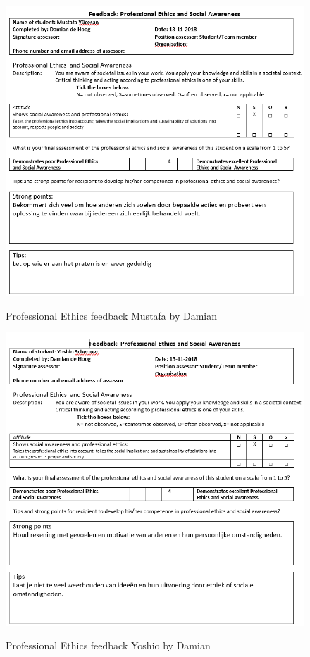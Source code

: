 \documentclass[12pt]{article}
\begin{document}
	\begin{figure}[p!]
		\centering
		\includegraphics[width=\columnwidth]{ProfEthMustafa.PNG}\\
		\caption{Professional Ethics feedback Mustafa by Damian}
	\end{figure}
	\begin{figure}[p!]
		\centering
		\includegraphics[width=\columnwidth]{ProfEthYoshio.PNG}\\
		\caption{Professional Ethics feedback Yoshio by Damian}
	\end{figure}
\end{document}
